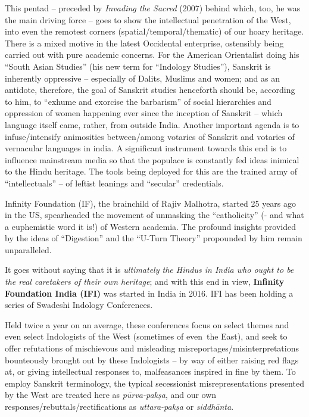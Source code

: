 This pentad -- preceded by {\sl Invading the Sacred} (2007) behind which, too, he was the main driving force -- goes to show the intellectual penetration of the West, into even the remotest corners (spatial/temporal/\break thematic) of our hoary heritage. There is a mixed motive in the latest Occidental enterprise,  ostensibly being carried out with pure academic concerns. For the American Orientalist doing his ``South Asian Studies'' (his new term for “Indology Studies”), Sanskrit is inherently oppressive -- especially of Dalits, Muslims and women; and as an antidote, therefore, the goal of Sanskrit studies henceforth should be, according to him, to ``exhume and exorcise the barbarism'' of social hierarchies and oppression of women happening ever since the inception of Sanskrit -- which language itself came, rather, from outside India. Another important agenda is to infuse/intensify animosities between/among votaries of Sanskrit and votaries of vernacular languages in india. A significant instrument towards this end is to influence mainstream media so that the populace is constantly fed ideas inimical to the Hindu heritage. The tools being deployed for this are the trained army of “intellectuals” -- of leftist leanings and “secular” credentials.
\vskip 1.5pt

Infinity Foundation (IF), the brainchild of Rajiv Malhotra, started 25 years ago in the US, spearheaded the movement of unmasking the “catholicity” (- and what a euphemistic word it is!) of Western academia. The profound insights provided by the ideas of ``Digestion'' and the “U-Turn Theory” propounded by him remain unparalleled.
\vskip 1.5pt

It goes without saying that it is {\sl ultimately the Hindus in India who ought to be the real caretakers of their own heritage}; and with this end in view, {\bf Infinity Foundation India (IFI)} was started in India in 2016. IFI has been holding a series of Swadeshi Indology Conferences. 
\vskip 1.5pt

Held twice a year on an average, these conferences focus on select themes and even select Indologists of the West (sometimes of even~the East), and seek to offer refutations of mischievous  and misleading misreportages/misinterpretations bounteously brought out by these Indologists -- by way of either raising red flags at, or giving intellectual responses to, malfeasances inspired in fine by them. To employ Sanskrit terminology, the typical secessionist misrepresentations presented by the West are treated here as {\sl pūrva-pakṣa}, and our own responses/rebuttals/rectifications as {\sl uttara-pakṣa} or {\sl siddhānta}. 

